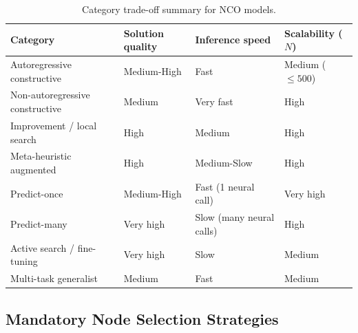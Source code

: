 \documentclass{article}
\begin{document}
\begin{table}[H]
    \centering
    \caption{Category trade-off summary for NCO models.}
    \begin{tabularx}{\textwidth}{@{} X l l l @{}}
        \toprule
        \textbf{Category} & \textbf{Solution quality} & \textbf{Inference speed} & \textbf{Scalability ($N$)} \\
        \midrule
        Autoregressive constructive & Medium-High & Fast & Medium ($\le 500$) \\
        Non-autoregressive constructive & Medium & Very fast & High \\
        Improvement / local search & High & Medium & High \\
        Meta-heuristic augmented & High & Medium-Slow & High \\
        Predict-once & Medium-High & Fast (1 neural call) & Very high \\
        Predict-many & Very high & Slow (many neural calls) & High \\
        Active search / fine-tuning & Very high & Slow & Medium \\
        Multi-task generalist & Medium & Fast & Medium \\
        \bottomrule
    \end{tabularx}
\end{table}


\subsection*{Mandatory Node Selection Strategies}
\end{document}
